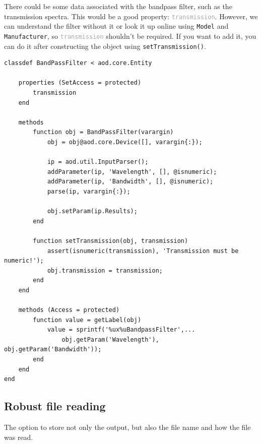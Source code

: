 \documentclass[10pt]{exam}
\newcommand\aodparam[1]{\textcolor{codepurple}{\texttt{#1}}}
\newcommand\aodprop[1]{\textcolor{darkgray}{\texttt{#1}}}
\newcommand\aodfcn[1]{\textcolor{darkteal}{\texttt{#1}}}
\begin{document}
	There could be some data associated with the bandpass filter, such as the transmission spectra. This would be a good property: \aodprop{transmission}. However, we can understand the filter without it or look it up online using \aodparam{Model} and \aodparam{Manufacturer}, so \aodprop{transmission} shouldn't be required. If you want to add it, you can do it after constructing the object using \aodfcn{setTransmission()}.
	\begin{lstlisting}[style=matlab-editor, basicstyle=\mlttfamily\footnotesize]
classdef BandPassFilter < aod.core.Entity

	properties (SetAccess = protected)
		transmission
	end
	
	methods
		function obj = BandPassFilter(varargin)
			obj = obj@aod.core.Device([], varargin{:});
			
			ip = aod.util.InputParser();
			addParameter(ip, 'Wavelength', [], @isnumeric);
			addParameter(ip, 'Bandwidth', [], @isnumeric);
			parse(ip, varargin{:});
			
			obj.setParam(ip.Results);
		end
		
		function setTransmission(obj, transmission)
			assert(isnumeric(transmission), 'Transmission must be numeric!');
			obj.transmission = transmission;
		end
	end
	
	methods (Access = protected)
		function value = getLabel(obj)
			value = sprintf('%ux%uBandpassFilter',...
				obj.getParam('Wavelength'), obj.getParam('Bandwidth'));
		end
	end
end
	\end{lstlisting}	
	\subsection{Robust file reading}
		\noindent The option to store not only the output, but also the file name and how the file was read.
\end{document}
